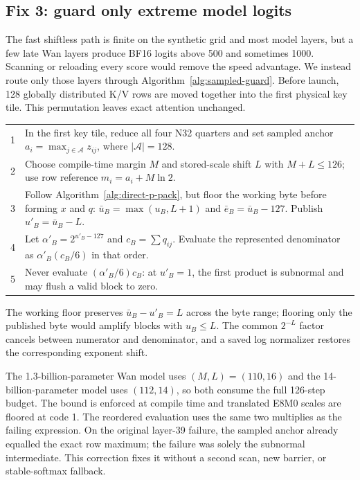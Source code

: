 \subsection{Fix 3: guard only extreme model logits}

The fast shiftless path is finite on the synthetic grid and most model
layers, but a few late Wan layers produce BF16 logits above 500 and sometimes
1000. Scanning or reloading every score would remove the speed advantage. We
instead route only those layers through Algorithm~\ref{alg:sampled-guard}.
Before launch, 128 globally distributed K/V rows are moved together into the
first physical key tile. This permutation leaves exact attention unchanged.

\begin{algorithm}[H]
\caption{Sampled QK guard and underflow-safe represented denominator}
\label{alg:sampled-guard}
\small
\begin{tabularx}{\textwidth}{@{}rX@{}}
\toprule
1 & In the first key tile, reduce all four N32 quarters and set sampled anchor $a_i=\max_{j\in\mathcal A}z_{ij}$, where $|\mathcal A|=128$. \\
2 & Choose compile-time margin $M$ and stored-scale shift $L$ with $M+L\le126$; use row reference $m_i=a_i+M\ln2$. \\
3 & Follow Algorithm~\ref{alg:direct-p-pack}, but floor the working byte before forming $x$ and $q$: $\bar u_B=\max(u_B,L+1)$ and $\bar e_B=\bar u_B-127$. Publish $u'_B=\bar u_B-L$. \\
4 & Let $\alpha'_B=2^{u'_B-127}$ and $c_B=\sum q_{ij}$. Evaluate the represented denominator as $\alpha'_B(c_B/6)$ in that order. \\
5 & Never evaluate $(\alpha'_B/6)c_B$: at $u'_B=1$, the first product is subnormal and may flush a valid block to zero. \\
\bottomrule
\end{tabularx}
\end{algorithm}

The working floor preserves $\bar u_B-u'_B=L$ across the byte range; flooring
only the published byte would amplify blocks with $u_B\le L$.  The common
$2^{-L}$ factor cancels between numerator and denominator, and a saved log
normalizer restores the corresponding exponent shift.

The 1.3-billion-parameter Wan model uses $(M,L)=(110,16)$ and the
14-billion-parameter model uses $(112,14)$, so both consume the
full 126-step budget. The bound is enforced at compile time and translated
E8M0 scales are floored at code 1. The reordered evaluation uses the same two
multiplies as the failing expression. On the original layer-39 failure, the
sampled anchor already equalled the exact row maximum; the failure was solely
the subnormal intermediate. This correction fixes it without a second scan,
new barrier, or stable-softmax fallback.

